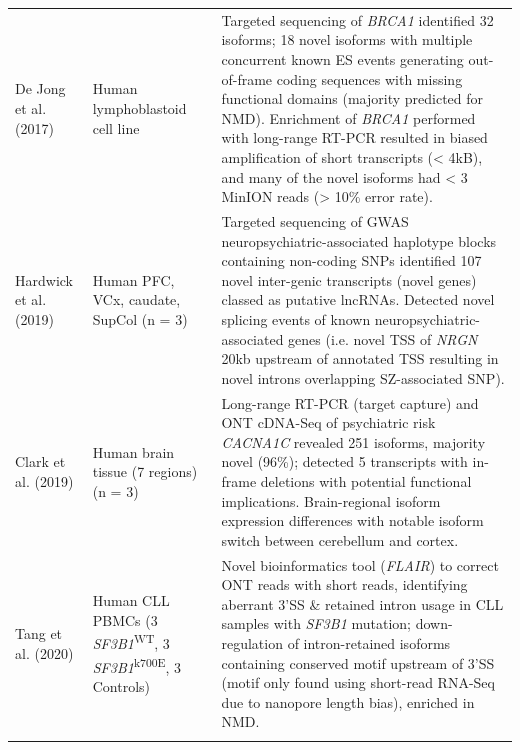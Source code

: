 \begin{landscape}
\begin{longtable}[c]{p{4cm}p{4cm}p{18cm}}
		\centering De Jong et al. (2017)\cite{DeJong2017}  &
		\centering Human lymphoblastoid cell line &
		\tabitem Targeted sequencing of \textit{BRCA1} identified 32 isoforms; 18 novel isoforms with multiple concurrent known ES events generating out-of-frame coding sequences with missing functional domains (majority predicted for NMD). \newline
		\tabitem Enrichment of \textit{BRCA1} performed with long-range RT-PCR resulted in biased amplification of short transcripts (< 4kB), and many of the novel isoforms had < 3 MinION reads (> 10\% error rate).  \\
		\hdashline[0.5pt/5pt]
		
		\centering Hardwick et al. (2019) \cite{Hardwick2019a} &
		\centering Human PFC, VCx, \newline caudate, SupCol (n = 3)  &
		\tabitem Targeted sequencing of GWAS neuropsychiatric-associated haplotype blocks containing non-coding SNPs identified 107 novel inter-genic transcripts (novel genes) classed as putative lncRNAs. \newline 
		\tabitem Detected novel splicing events of known neuropsychiatric-associated genes (i.e. novel TSS of \textit{NRGN} 20kb upstream of annotated TSS resulting in novel introns overlapping SZ-associated SNP).  \\
		\hdashline[0.5pt/5pt]
		
		\centering Clark et al. (2019) \cite{Clark2019} &
		\centering Human brain tissue \newline (7 regions) (n = 3) &
		\tabitem Long-range RT-PCR (target capture) and ONT cDNA-Seq of psychiatric risk \textit{CACNA1C} revealed 251 isoforms, majority novel (96\%); detected 5 transcripts with in-frame deletions with potential functional implications.  \newline 
		\tabitem Brain-regional isoform expression differences with notable isoform switch between cerebellum and cortex.  \\
		
		\centering Tang et al. (2020) \cite{Tang2020} &
		\centering Human CLL PBMCs \newline (3 \textit{SF3B1}\textsuperscript{WT}, 3 \textit{SF3B1}\textsuperscript{k700E}, 3 Controls) &
		\tabitem Novel bioinformatics tool (\textit{FLAIR}) to correct ONT reads with short reads, identifying aberrant 3'SS \& retained intron usage in CLL samples with \textit{SF3B1} mutation; down-regulation of intron-retained isoforms containing conserved motif upstream of 3'SS (motif only found using short-read RNA-Seq due to nanopore length bias), enriched in NMD.  \\
		\hdashline[0.5pt/5pt]
		

\end{longtable}
\end{landscape}
